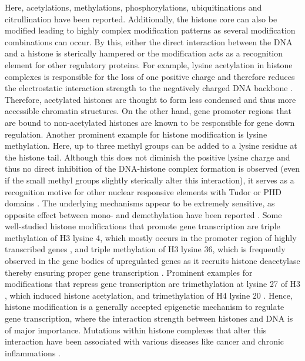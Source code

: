 \documentclass{article}
\begin{document}
Here, acetylations, methylations, phosphorylations, ubiquitinations and citrullination have been reported. Additionally, the histone core can also be modified leading to highly complex modification patterns as several modification combinations can occur. By this, either the direct interaction between the DNA and a histone is sterically hampered or the modification acts as a recognition element for other regulatory proteins. For example, lysine acetylation in histone complexes is responsible for the loss of one positive charge and therefore reduces the electrostatic interaction strength to the negatively charged DNA backbone \cite{ozdemir2005characterization}. Therefore, acetylated histones are thought to form less condensed and thus more accessible chromatin structures. On the other hand, gene promoter regions that are bound to non-acetylated histones are known to be responsible for gene down regulation. Another prominent example for histone modification is lysine methylation. Here, up to three methyl groups can be added to a lysine residue at the histone tail. Although this does not diminish the positive lysine charge and thus no direct inhibition of the DNA-histone complex formation is observed (even if the small methyl groups slightly sterically alter this interaction), it serves as a recognition motive for other nuclear responsive elements with Tudor or PHD domains \cite{schotta2004silencing}. The underlying mechanisms appear to be extremely sensitive, as opposite effect between mono- and demethylation have been reported \cite{kourmouli2004heterochromatin}. 
Some well-studied histone modifications that promote gene transcription are triple methylation of H3 lysine 4, which mostly occurs in the promoter region of highly transcribed genes \cite{krogan2003paf1}, and triple methylation of H3 lysine 36, which is frequently observed in the gene bodies of upregulated genes as it recruits histone deacetylase thereby ensuring proper gene transcription \cite{strahl2002set2}. Prominent examples for modifications that repress gene transcription are trimethylation at lysine 27 of H3 \cite{cao2002role}, which induced histone acetylation, and trimethylation of H4 lysine 20 \cite{schotta2004silencing}. 
Hence, histone modification is a generally accepted epigenetic mechanism to regulate gene transcription, where the interaction strength between histones and DNA is of major importance. Mutations within histone complexes that alter this interaction have been associated with various diseases like cancer and chronic inflammations \cite{sawan2010histone}. 
\end{document}
